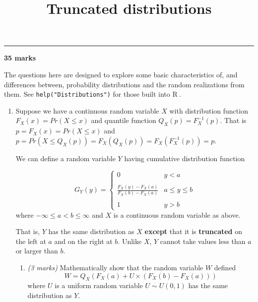 \documentclass[
  9pt,
]{article}
\title{Truncated distributions}
\author{}
\date{\vspace{-2.5em}}
\begin{document}
\maketitle

\begin{center}\rule{0.5\linewidth}{0.5pt}\end{center}

\textbf{35 marks}

The questions here are designed to explore some basic characteristics
of, and differences between, probability distributions and the random
realizations from them. See \texttt{help("Distributions")} for those
built into \textsf{R}$~$.

\begin{enumerate}
\def\labelenumi{\arabic{enumi}.}
\item
  Suppose we have a continuous random variable \(X\) with distribution
  function \(F_X(x) = Pr(X \le x)\) and quantile function
  \(Q_X(p) = F_X^{-1}(p)\). That is \(p = F_X(x) = Pr(X \le x)\) and
  \(p = Pr(X \le Q_X(p)) = F_X(Q_X(p)) = F_X(F_X^{-1}(p)) = p\).

  We can define a random variable \(Y\) having cumulative distribution
  function

  \[ G_Y(y) = 
           \left\{ 
           \begin{array}{ll}
           0 & y < a \\
           &\\
           \frac{F_X(y) - F_X(a)}{F_X(b) - F_X(a)} &
           a \le y \le b \\
           &\\
           1 & y > b
           \end{array}
           \right. 
   \] where \(-\infty \le a < b \le \infty\) and \(X\) is a continuous
  random variable as above.

  That is, \(Y\) has the same distribution as \(X\) \textbf{except} that
  it is \textbf{truncated} on the left at \(a\) and on the right at
  \(b\). Unlike \(X\), \(Y\) cannot take values less than \(a\) or
  larger than \(b\).

  \begin{enumerate}
  \def\labelenumii{\alph{enumii}.}
  \item
    \emph{(3 marks)} Mathematically show that the random variable \(W\)
    defined \[W = Q_X(F_X(a) + U \times (F_X(b) - F_X(a))) \] where
    \(U\) is a uniform random variable \(U \sim U(0,1)\) has the same
    distribution as \(Y\).


\end{enumerate}
\end{enumerate}
\end{document}
